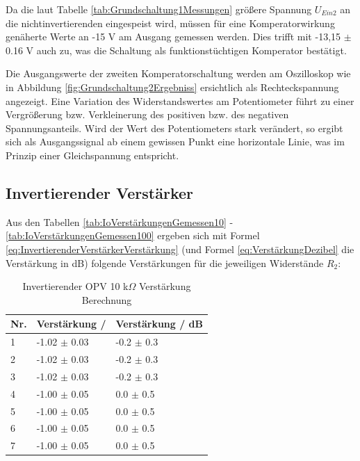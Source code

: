 \documentclass[12pt,a4paper,twoside]{article}
\begin{document}
\noindent
Da die laut Tabelle \ref{tab:Grundschaltung1Messungen} größere Spannung $U_{Ein2}$ an die nichtinvertierenden eingespeist wird, müssen für eine Komperatorwirkung genäherte Werte an -15 V am Ausgang gemessen werden. Dies trifft mit -13,15 $\pm$ 0.16 V auch zu, was die Schaltung als funktionstüchtigen Komperator bestätigt. \newline

\noindent
Die Ausgangswerte der zweiten Komperatorschaltung werden am Oszilloskop wie in Abbildung \ref{fig:Grundschaltung2Ergebniss} ersichtlich als Rechteckspannung angezeigt. 
Eine Variation des Widerstandswertes am Potentiometer führt zu einer Vergrößerung bzw. Verkleinerung des positiven bzw. des negativen Spannungsanteils. Wird der Wert des Potentiometers stark verändert, so ergibt sich als Ausgangssignal ab einem gewissen Punkt eine horizontale Linie, was im Prinzip einer Gleichspannung entspricht. 


\subsection{Invertierender Verstärker}

Aus den Tabellen \ref{tab:IoVerstärkungenGemessen10} - \ref{tab:IoVerstärkungenGemessen100} ergeben sich mit Formel \ref{eq:InvertierenderVerstärkerVerstärkung} (und Formel \ref{eq:VerstärkungDezibel} die Verstärkung in dB) folgende Verstärkungen für die jeweiligen Widerstände $R_{2}$:

\begin{table}[H]
    \centering
    \caption{Invertierender OPV 10 k$\Omega$ Verstärkung Berechnung}
    \label{tab:IoVerstärkungenBerechnet10}
    \begin{tabular}{| l | l | l |}
        \hline
        Nr. & Verstärkung / & Verstärkung / dB \\
        \hline
        1 & -1.02 $\pm$ 0.03 & -0.2 $\pm$ 0.3 \\
        2 & -1.02 $\pm$ 0.03 & -0.2 $\pm$ 0.3 \\
        3 & -1.02 $\pm$ 0.03 & -0.2 $\pm$ 0.3 \\
        4 & -1.00 $\pm$ 0.05 &  0.0 $\pm$ 0.5 \\
        5 & -1.00 $\pm$ 0.05 &  0.0 $\pm$ 0.5 \\
        6 & -1.00 $\pm$ 0.05 &  0.0 $\pm$ 0.5 \\
        7 & -1.00 $\pm$ 0.05 &  0.0 $\pm$ 0.5 \\
        \hline
    \end{tabular}
\end{table}
\end{document}
